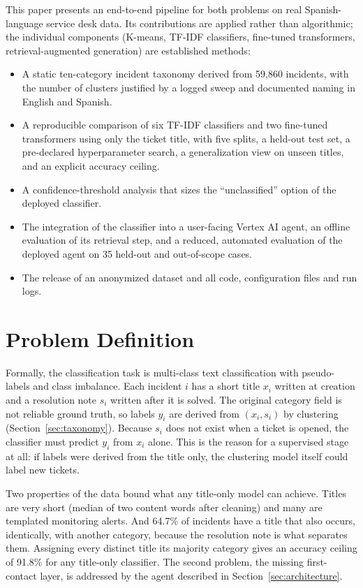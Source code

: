 \documentclass[conference]{IEEEtran}
\begin{document}
This paper presents an end-to-end pipeline for both problems on real Spanish-language service desk data. Its
contributions are applied rather than algorithmic; the individual components (K-means, TF-IDF classifiers,
fine-tuned transformers, retrieval-augmented generation) are established methods:
\begin{itemize}
\item A static ten-category incident taxonomy derived from 59,860 incidents, with the number of clusters
justified by a logged sweep and documented naming in English and Spanish.
\item A reproducible comparison of six TF-IDF classifiers and two fine-tuned transformers using only the
ticket title, with five splits, a held-out test set, a pre-declared hyperparameter search, a
generalization view on unseen titles, and an explicit accuracy ceiling.
\item A confidence-threshold analysis that sizes the ``unclassified'' option of the deployed classifier.
\item The integration of the classifier into a user-facing Vertex AI agent, an offline evaluation of its
retrieval step, and a reduced, automated evaluation of the deployed agent on 35 held-out and out-of-scope cases.
\item The release of an anonymized dataset and all code, configuration files and run logs.
\end{itemize}

\section{Problem Definition}

Formally, the classification task is multi-class text classification with pseudo-labels and class
imbalance. Each incident $i$ has a short title $x_i$ written at creation and a resolution note $s_i$
written after it is solved. The original category field is not reliable ground truth, so labels $y_i$ are
derived from $(x_i, s_i)$ by clustering (Section~\ref{sec:taxonomy}). Because $s_i$ does not exist when a
ticket is opened, the classifier must predict $y_i$ from $x_i$ alone. This is the reason for a supervised
stage at all: if labels were derived from the title only, the clustering model itself could label new
tickets.

Two properties of the data bound what any title-only model can achieve. Titles are very short (median of
two content words after cleaning) and many are templated monitoring alerts. And 64.7\% of incidents have a
title that also occurs, identically, with another category, because the resolution note is what separates
them. Assigning every distinct title its majority category gives an accuracy ceiling of 91.8\% for any
title-only classifier. The second problem, the missing first-contact layer, is addressed by the agent described in
Section~\ref{sec:architecture}.
\end{document}
